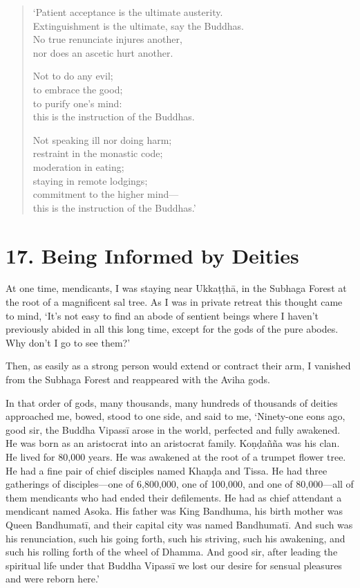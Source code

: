\documentclass[12pt,openany]{book}%
\begin{document}
\begin{verse}%
‘Patient acceptance is the ultimate austerity. \\
Extinguishment is the ultimate, say the Buddhas. \\
No true renunciate injures another, \\
nor does an ascetic hurt another. 

Not to do any evil; \\
to embrace the good; \\
to purify one’s mind: \\
this is the instruction of the Buddhas. 

Not speaking ill nor doing harm; \\
restraint in the monastic code; \\
moderation in eating; \\
staying in remote lodgings; \\
commitment to the higher mind—\\
this is the instruction of the Buddhas.’ 

%
\end{verse}

\section*{17. Being Informed by Deities }

At one time, mendicants, I was staying near \textsanskrit{Ukkaṭṭhā}, in the Subhaga Forest at the root of a magnificent sal tree. As I was in private retreat this thought came to mind, ‘It’s not easy to find an abode of sentient beings where I haven’t previously abided in all this long time, except for the gods of the pure abodes. Why don’t I go to see them?’ 

Then, as easily as a strong person would extend or contract their arm, I vanished from the Subhaga Forest and reappeared with the Aviha gods. 

In that order of gods, many thousands, many hundreds of thousands of deities approached me, bowed, stood to one side, and said to me, ‘Ninety-one eons ago, good sir, the Buddha \textsanskrit{Vipassī} arose in the world, perfected and fully awakened. He was born as an aristocrat into an aristocrat family. \textsanskrit{Koṇḍañña} was his clan. He lived for 80,000 years. He was awakened at the root of a trumpet flower tree. He had a fine pair of chief disciples named \textsanskrit{Khaṇḍa} and Tissa. He had three gatherings of disciples—one of 6,800,000, one of 100,000, and one of 80,000—all of them mendicants who had ended their defilements. He had as chief attendant a mendicant named Asoka. His father was King Bandhuma, his birth mother was Queen \textsanskrit{Bandhumatī}, and their capital city was named \textsanskrit{Bandhumatī}. And such was his renunciation, such his going forth, such his striving, such his awakening, and such his rolling forth of the wheel of Dhamma. And good sir, after leading the spiritual life under that Buddha \textsanskrit{Vipassī} we lost our desire for sensual pleasures and were reborn here.’ 
\end{document}
